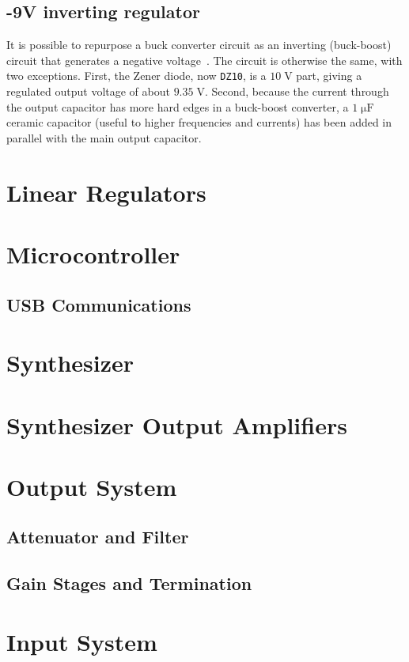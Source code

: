\documentclass[article]{memoir}
\newcommand{\refdes}[1]{\texttt{#1}}
\newcommand{\mr}[1]{\ensuremath{\mathrm{#1}}}
\begin{document}
\begin{multicols}{2}
\subsection{-9V inverting regulator}
It is possible to repurpose a buck converter circuit as an inverting
(buck-boost) circuit that generates a negative voltage~\cite{buckinv}. The
circuit is otherwise the same, with two exceptions. First, the Zener diode, now
\refdes{DZ10}, is a $10\;\mr{V}$ part, giving a regulated output voltage of
about $9.35\;\mr{V}$. Second, because the current through the output capacitor
has more hard edges in a buck-boost converter, a $1\;\mr{\mu F}$ ceramic
capacitor (useful to higher frequencies and currents) has been added in
parallel with the main output capacitor.

\section{Linear Regulators}

\section{Microcontroller}
\subsection{USB Communications}

\section{Synthesizer}

\section{Synthesizer Output Amplifiers}

\section{Output System}

\subsection{Attenuator and Filter}
\subsection{Gain Stages and Termination}

\section{Input System}


\end{multicols}
\end{document}
